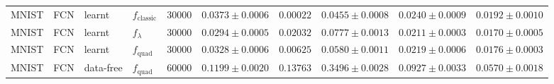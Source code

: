 \begin{tabular}{llll r r r r r r}
MNIST & FCN & learnt & $f_{\text{classic}}$ & 30000 & $0.0373\pm0.0006$ & $0.00022$ & $0.0455\pm0.0008$ & $0.0240\pm0.0009$ & $0.0192\pm0.0010$ \\
MNIST & FCN & learnt & $f_{\lambda}$ & 30000 & $0.0294\pm0.0005$ & $0.02032$ & $0.0777\pm0.0013$ & $0.0211\pm0.0003$ & $0.0170\pm0.0005$ \\
MNIST & FCN & learnt & $f_{\text{quad}}$ & 30000 & $0.0328\pm0.0006$ & $0.00625$ & $0.0580\pm0.0011$ & $0.0219\pm0.0006$ & $0.0176\pm0.0003$ \\
MNIST & FCN & data-free & $f_{\text{quad}}$ & 60000 & $0.1199\pm0.0020$ & $0.13763$ & $0.3496\pm0.0028$ & $0.0927\pm0.0033$ & $0.0570\pm0.0018$ \\
\bottomrule
\end{tabular}
